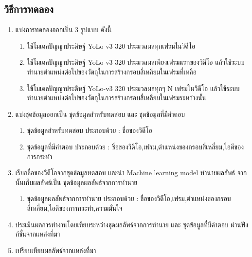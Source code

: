 \subsection*{วิธีการทดลอง}
	\begin{enumerate}
		\item แบ่งการทดลองออกเป็น 3 รูปแบบ ดังนี้
            \begin{enumerate}
                \item ใช้โมเดลปัญญาประดิษฐ์ YoLo-v3 320 ประมวลผลทุกเฟรมในวิดีโอ
                \item ใช้โมเดลปัญญาประดิษฐ์ YoLo-v3 320 ประมวลผลเพียงเฟรมแรกของวิดีโอ แล้วใช้ระบบทำนายตำแหน่งต่อไปของวัตถุในการสร้างกรอบสี่เหลี่ยมในเฟรมที่เหลือ
                \item ใช้โมเดลปัญญาประดิษฐ์ YoLo-v3 320 ประมวลผลทุกๆ N เฟรมในวิดีโอ แล้วใช้ระบบทำนายตำแหน่งต่อไปของวัตถุในการสร้างกรอบสี่เหลี่ยมในเฟรมระหว่างนั้น
            \end{enumerate}
		\item แบ่งชุดข้อมูลออกเป็น ชุดข้อมูลสำหรับทดสอบ และ ชุดข้อมูลที่มีคำตอบ
			\begin{enumerate}
				\item ชุดข้อมูลสำหรับทดสอบ ประกอบด้วย : ชื่อของวิดีโอ
				\item ชุดข้อมูลที่มีคำตอบ ประกอบด้วย : ชื่อของวิดีโอ,เฟรม,ตำแหน่งของกรอบสี่เหลี่ยม,ไอดีของการกระทำ
			\end{enumerate}
		\item เรียกชื่อของวิดีโอจากชุดข้อมูลทดสอบ และนำ Machine learning model ทำนายผลลัพธ์ จากนั้นเก็บผลลัพธ์เป็น ชุดข้อมูลผลลัพธ์จากการทำนาย
			\begin{enumerate}
				\item ชุดข้อมูลผลลัพธ์จากการทำนาย ประกอบด้วย : ชื่อของวิดีโอ,เฟรม,ตำแหน่งของกรอบสี่เหลี่ยม,ไอดีของการกระทำ,ความมั่นใจ
			\end{enumerate}
		\item ประเมินผลการทำงานโดยเทียบระหว่างชุดผลลัพธ์จากการทำนาย และ ชุดข้อมูลที่มีคำตอบ ผ่านฟังก์ชั่นจากแหล่งที่มา		
		\item เปรียบเทียบผลลัพธ์จากแหล่งที่มา
\end{enumerate}